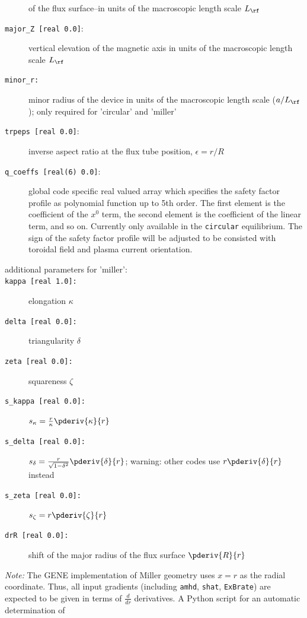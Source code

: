 \documentclass[12pt]{article}
\begin{document}
\begin{description}
of the flux surface--in units of the macroscopic length scale $L_\rf$
\item[\hypertarget{major_Z}{\texttt{major\_Z [real 0.0]}}:] vertical elevation of the magnetic axis in units of the macroscopic length scale $L_\rf$
\item[\hypertarget{minor_r}{\texttt{minor\_r:}}] minor radius of the device in units of the macroscopic length scale ($a/L_\rf$);
 only required for 'circular' and 'miller'
\item[\hypertarget{trpeps}{\texttt{trpeps [real 0.0]}}:] inverse aspect ratio at the flux tube position, $\epsilon=r/R$
\item[\hypertarget{q_coeffs}{\texttt{q\_coeffs [real(6) 0.0]}}:] global code specific real valued array which specifies the safety factor profile as
polynomial function up to 5th order. The first element is the coefficient of the $x^0$ term, the second element is the coefficient of the linear term,
and so on. Currently only available in the {\tt circular} equilibrium. The sign of the safety factor profile will be adjusted to be consisted with toroidal field and plasma current orientation.
%
\item[additional parameters for \hypertarget{desc:miller}{'miller'}:]
\item[\texttt{kappa [real 1.0]:}] elongation $\kappa$
\item[\texttt{delta [real 0.0]:}] triangularity $\delta$
\item[\texttt{zeta [real 0.0]:}] squareness $\zeta$
\item[\texttt{s\_kappa [real 0.0]:}] $s_\kappa = \frac{r}{\kappa} \pderiv{\kappa}{r}$
\item[\texttt{s\_delta [real 0.0]:}] $s_\delta = \frac{r}{\sqrt{1-\delta^2}} \pderiv{\delta}{r}$; warning: other codes use $r \pderiv{\delta}{r}$ instead
\item[\texttt{s\_zeta [real 0.0]:}]  $s_\zeta = r \pderiv{\zeta}{r}$
\item[\texttt{drR [real 0.0]:}] shift of the major radius of the flux surface $\pderiv{R}{r}$
\end{description}
{\em Note:} The GENE implementation of Miller geometry uses $x=r$ as the radial coordinate.
Thus, all input gradients (including {\tt amhd}, {\tt shat}, {\tt ExBrate}) are expected to be
given in terms of $\frac{d}{dr}$ derivatives. A Python script for an automatic determination of
\end{document}
